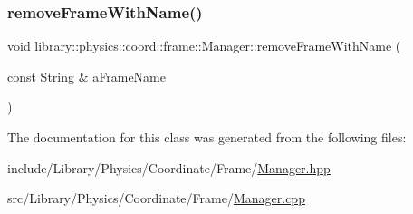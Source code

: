 \mbox{\label{classlibrary_1_1physics_1_1coord_1_1frame_1_1_manager_a63e05e289d34f354dafefbff2b8478af}} 
\subsubsection{\texorpdfstring{remove\+Frame\+With\+Name()}{removeFrameWithName()}}
{\footnotesize\ttfamily void library\+::physics\+::coord\+::frame\+::\+Manager\+::remove\+Frame\+With\+Name (\begin{DoxyParamCaption}\item[{const String \&}]{a\+Frame\+Name }\end{DoxyParamCaption})}



The documentation for this class was generated from the following files\+:\begin{DoxyCompactItemize}
\item 
include/\+Library/\+Physics/\+Coordinate/\+Frame/\hyperlink{_manager_8hpp}{Manager.\+hpp}\item 
src/\+Library/\+Physics/\+Coordinate/\+Frame/\hyperlink{_manager_8cpp}{Manager.\+cpp}\end{DoxyCompactItemize}
